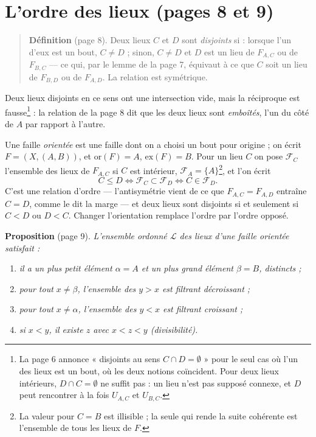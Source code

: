 \documentclass[11pt,a4paper]{article}
\begin{document}
\section*{L'ordre des lieux (pages 8 et 9)}

\begin{quote}
\textbf{Définition} (page 8). Deux lieux $C$ et $D$ sont \emph{disjoints} si :
lorsque l'un d'eux est un bout, $C \neq D$ ; sinon, $C \neq D$ et $D$ est un lieu
de $F_{A,C}$ ou de $F_{B,C}$ --- ce qui, par le lemme de la page 7, équivaut à ce
que $C$ soit un lieu de $F_{B,D}$ ou de $F_{A,D}$. La relation est symétrique.
\end{quote}

Deux lieux disjoints en ce sens ont une intersection vide, mais la réciproque est
fausse\footnote{La page 6 annonce « disjoints au sens $C \cap D = \emptyset$ » pour
le seul cas où l'un des lieux est un bout, où les deux notions coïncident. Pour
deux lieux intérieurs, $D \cap C = \emptyset$ ne suffit pas : un lieu n'est pas
supposé connexe, et $D$ peut rencontrer à la fois $U_{A,C}$ et $U_{B,C}$.} : la
relation de la page 8 dit que les deux lieux sont \emph{emboîtés}, l'un du côté de
$A$ par rapport à l'autre.

Une faille \emph{orientée} est une faille dont on a choisi un bout pour origine ;
on écrit $F = (X, (A,B))$, et $\mathrm{or}(F) = A$, $\mathrm{ex}(F) = B$. Pour
un lieu $C$ on pose $\mathcal{F}_{C}$ l'ensemble des lieux de $F_{A,C}$ si $C$ est
intérieur, $\mathcal{F}_{A} = \{A\}$\footnote{La valeur pour $C = B$ est
illisible ; la seule qui rende la suite cohérente est l'ensemble de tous les
lieux de $F$.}, et l'on écrit
\[
C \leq D \iff \mathcal{F}_{C} \subset \mathcal{F}_{D} \iff C \in
\mathcal{F}_{D}.
\]
C'est une relation d'ordre --- l'antisymétrie vient de ce que $F_{A,C} =
F_{A,D}$ entraîne $C = D$, comme le dit la marge --- et deux lieux sont disjoints
si et seulement si $C < D$ ou $D < C$. Changer l'orientation remplace l'ordre par
l'ordre opposé.

\textbf{Proposition} (page 9). \emph{L'ensemble ordonné $\mathcal{L}$ des lieux
d'une faille orientée satisfait :}
\begin{enumerate}
\item[a)] \emph{il a un plus petit élément $\alpha = A$ et un plus grand élément
$\beta = B$, distincts ;}
\item[b)] \emph{pour tout $x \neq \beta$, l'ensemble des $y > x$ est filtrant
décroissant ;}
\item[b')] \emph{pour tout $x \neq \alpha$, l'ensemble des $y < x$ est filtrant
croissant ;}
\item[c)] \emph{si $x < y$, il existe $z$ avec $x < z < y$ (divisibilité).}
\end{enumerate}
\end{document}
